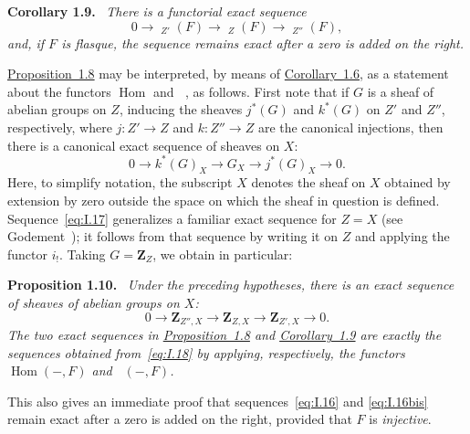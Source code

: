 \documentclass[11pt,a4paper,oneside]{book}
\providecommand{\ZZ}{\mathbf Z}
\providecommand{\uGamma}{\mathop{\underline{\Gamma}}\nolimits}
\providecommand{\uHom}{\mathop{\underline{\mathrm{Hom}}}\nolimits}
\newenvironment{sgastatement}[1]
  {\par\addvspace{0.8\baselineskip}\noindent\textbf{#1.}\ \itshape}
  {\par\addvspace{0.35\baselineskip}}
\theoremstyle{plain}
\theoremstyle{definition}
\theoremstyle{remark}
\begin{document}
\begin{sgastatement}{Corollary 1.9}
There is a functorial exact sequence
\begin{equation}
  0\longrightarrow\uGamma_{Z'}(F)
  \longrightarrow\uGamma_Z(F)
  \longrightarrow\uGamma_{Z''}(F),
  \tag{16 bis}\label{eq:I.16bis}
\end{equation}
and, if $F$ is flasque, the sequence remains exact after a zero is added
on the right.
\end{sgastatement}

\hyperref[I.1.8]{Proposition~1.8} may be interpreted, by means of \hyperref[I.1.6]{Corollary~1.6}, as a
statement about the functors $\operatorname{Hom}$ and $\uHom$, as
follows.  First note that if $G$ is a sheaf of abelian groups on $Z$,
inducing the sheaves $j^*(G)$ and $k^*(G)$ on $Z'$ and $Z''$,
respectively, where $j:Z'\to Z$ and $k:Z''\to Z$ are the canonical
injections, then there is a canonical exact sequence of sheaves on $X$:
\begin{equation}
  0\longrightarrow k^*(G)_X
  \longrightarrow G_X
  \longrightarrow j^*(G)_X
  \longrightarrow 0.
  \tag{17}\label{eq:I.17}
\end{equation}
Here, to simplify notation, the subscript $X$ denotes the sheaf on $X$
obtained by extension by zero outside the space on which the sheaf in
question is defined.  Sequence~\eqref{eq:I.17} generalizes a familiar
exact sequence for $Z=X$ (see Godement~\cite{Godement}); it follows from
that sequence by writing it on $Z$ and applying the functor $i_!$.
Taking $G=\ZZ_Z$, we obtain in particular:

\begin{sgastatement}{Proposition 1.10}
Under the preceding hypotheses, there is an exact sequence of sheaves of
abelian groups on $X$:
\begin{equation}
  0\longrightarrow\ZZ_{Z'',X}
  \longrightarrow\ZZ_{Z,X}
  \longrightarrow\ZZ_{Z',X}
  \longrightarrow 0.
  \tag{18}\label{eq:I.18}
\end{equation}
The two exact sequences in \hyperref[I.1.8]{Proposition~1.8} and \hyperref[I.1.9]{Corollary~1.9} are exactly
the sequences obtained from~\eqref{eq:I.18} by applying, respectively,
the functors $\operatorname{Hom}(-,F)$ and $\uHom(-,F)$.
\end{sgastatement}

This also gives an immediate proof that sequences~\eqref{eq:I.16} and
\eqref{eq:I.16bis} remain exact after a zero is added on the right,
provided that $F$ is \emph{injective}.
\end{document}
